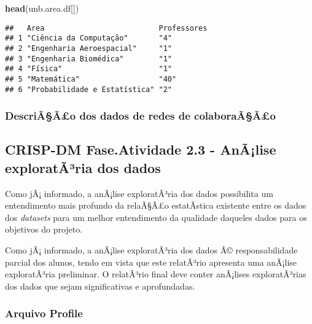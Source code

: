 \documentclass[]{article}
\newenvironment{Shaded}{\begin{snugshade}}{\end{snugshade}}
\newcommand{\KeywordTok}[1]{\textcolor[rgb]{0.13,0.29,0.53}{\textbf{#1}}}
\newcommand{\CommentTok}[1]{\textcolor[rgb]{0.56,0.35,0.01}{\textit{#1}}}
\newcommand{\ControlFlowTok}[1]{\textcolor[rgb]{0.13,0.29,0.53}{\textbf{#1}}}
\newcommand{\OperatorTok}[1]{\textcolor[rgb]{0.81,0.36,0.00}{\textbf{#1}}}
\newcommand{\NormalTok}[1]{#1}
\begin{document}
\begin{Shaded}
\begin{Highlighting}[]
\KeywordTok{head}\NormalTok{(unb.area.df[])}
\end{Highlighting}
\end{Shaded}

\begin{verbatim}
##   Area                          Professores
## 1 "Ciência da Computação"       "4"        
## 2 "Engenharia Aeroespacial"     "1"        
## 3 "Engenharia Biomédica"        "1"        
## 4 "Física"                      "1"        
## 5 "Matemática"                  "40"       
## 6 "Probabilidade e Estatística" "2"
\end{verbatim}

\subsubsection{DescriÃ§Ã£o dos dados de redes de
colaboraÃ§Ã£o}\label{descriaao-dos-dados-de-redes-de-colaboraaao}

\subsection{CRISP-DM Fase.Atividade 2.3 - AnÃ¡lise exploratÃ³ria dos
dados}\label{crisp-dm-fase.atividade-2.3---analise-explorataria-dos-dados}

Como jÃ¡ informado, a anÃ¡lise exploratÃ³ria dos dados possibilita um
entendimento mais profundo da relaÃ§Ã£o estatÃ­stica existente entre os
dados dos \emph{datasets} para um melhor entendimento da qualidade
daqueles dados para os objetivos do projeto.

Como jÃ¡ informado, a anÃ¡lise exploratÃ³ria dos dados Ã©
responsabilidade parcial dos alunos, tendo em vista que este relatÃ³rio
apresenta uma anÃ¡lise exploratÃ³ria preliminar. O relatÃ³rio final deve
conter anÃ¡lises exploratÃ³rias dos dados que sejam significativas e
aprofundadas.

\subsubsection{Arquivo Profile}\label{arquivo-profile}

\begin{Shaded}
\end{Shaded}
\end{document}
